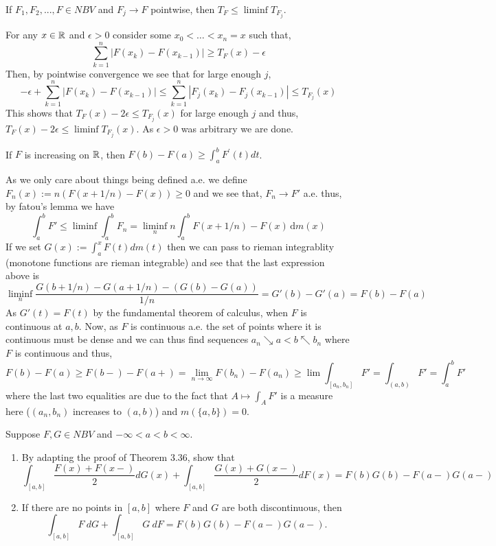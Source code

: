 \documentclass[12pt,a4paper]{article}
\begin{document}
\begin{problem}\label{prob:3-32}
If $F_{1},F_{2},...,F\in NBV$ and $F_{j}\rightarrow F$ pointwise, then $T_{F}\le \liminf T_{F_{j}}$.
\end{problem}
\begin{solution}
For any $x\in\mathbb{R}$ and $\epsilon>0$ consider some $x_0<\ldots<x_n=x$ such that,
\[
    \sum_{k=1}^n|F(x_k)-F(x_{k-1})|\geq T_F(x)-\epsilon
\]
Then, by pointwise convergence we see that for large enough $j$,
\[
    -\epsilon+\sum_{k=1}^n|F(x_k)-F(x_{k-1})|\leq\sum_{k=1}^n|F_j(x_k)-F_j(x_{k-1})|\leq T_{F_j}(x)
\]
This shows that $T_{F}(x)-2\epsilon\leq T_{F_j}(x)$ for large enough $j$ and thus, $T_F(x)-2\epsilon\leq\liminf T_{F_j}(x)$. 
As $\epsilon>0$ was arbitrary we are done.
\end{solution}
\begin{problem}\label{prob:3-33}
If $F$ is increasing on $\mathbb{R}$, then $F(b)-F(a)\ge\int_{a}^{b}F^{\prime}(t)dt$.
\end{problem}
\begin{solution}
As we only care about things being defined a.e. we define $F_n(x):=n(F(x+1/n)-F(x))\geq 0$ and we see that, $F_n\to F'$ a.e. thus, by fatou's lemma we have
\[
    \int_a^bF'\leq\liminf\int_a^b F_n=\liminf_nn\int_a^bF(x+1/n)-F(x)\,\mathrm{d}m(x)
\]
If we set $G(x):=\int_a^xF(t)dm(t)$ then we can pass to rieman integrablity (monotone functions are rieman integrable) and see that the last expression above is
\[
    \liminf_n\frac{G(b+1/n)-G(a+1/n)-(G(b)-G(a))}{1/n}=G'(b)-G'(a)=F(b)-F(a)
\]
As $G'(t)=F(t)$ by the fundamental theorem of calculus, when $F$ is continuous at $a,b.$ 
Now, as $F$ is continuous a.e. the set of points where it is continuous must be dense and we can thus find sequences $a_n\searrow a<b\nwarrow b_n$ where $F$ is continuous and thus, 
\[
    F(b)-F(a)\geq F(b-)-F(a+)=\lim_{n\to\infty} F(b_n)-F(a_n)\geq\lim\int_{[a_n,b_n]}F'=\int_{(a,b)}F'=\int_a^bF'
\]
where the last two equalities are due to the fact that $A\mapsto\int_AF'$ is a measure here ($(a_n,b_n)$ increases to $(a,b)$) and $m(\{a,b\})=0$.
\end{solution}
\begin{problem}\label{prob:3-34}
Suppose $F, G\in NBV$ and $-\infty<a<b<\infty.$
\begin{enumerate}[label=\alph*.]
    \item By adapting the proof of Theorem 3.36, show that
    \[\int_{[a,b]}\frac{F(x)+F(x-)}{2}dG(x)+\int_{[a,b]}\frac{G(x)+G(x-)}{2}dF(x)=F(b)G(b)-F(a-)G(a-)\]
    \item If there are no points in $[a, b]$ where $F$ and $G$ are both discontinuous, then
    \[\int_{[a,b]}F~dG+\int_{[a,b]}G~dF=F(b)G(b)-F(a-)G(a-).\]
\end{enumerate}
\end{problem}
\end{document}
